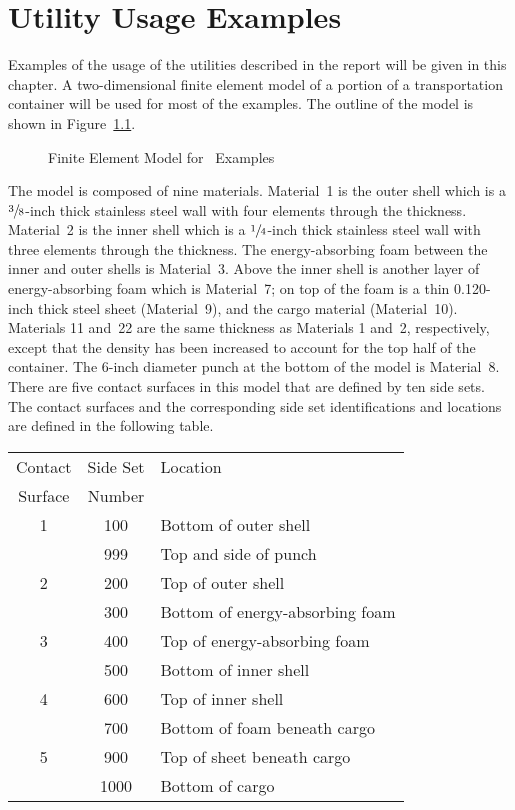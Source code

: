 \chapter{Utility Usage Examples}\label{c:examples}

Examples of the usage of the utilities described in the report will be
given in this chapter.  A two-dimensional finite element model of a
portion of a transportation container will be used for most of the
examples.  The outline of the model is shown in Figure~\ref{exmodel}.
\begin{figure}
\vspace{5.0in}
\caption{Finite Element Model for \numbers\ Examples}\label{exmodel}
\end{figure}
The model is composed of nine materials.  Material~1 is the outer shell
which is a $\sfrac{3}{8}$-inch thick stainless steel wall with four
elements through the thickness.  Material~2 is the inner shell which is
a $\sfrac{1}{4}$-inch thick stainless steel wall with three elements
through the thickness.  The energy-absorbing foam between the inner and
outer shells is Material~3.  Above the inner shell is another layer of
energy-absorbing foam which is Material~7;  on top of the foam is a thin
0.120-inch thick steel sheet (Material~9), and the cargo material
(Material~10).  Materials 11 and~22 are the same thickness as Materials
1 and~2, respectively, except that the density has been increased to
account for the top half of the container.  The 6-inch diameter punch at
the bottom of the model is Material~8.  There are five contact surfaces
in this model that are defined by ten side sets.  The contact surfaces
and the corresponding side set identifications and locations are defined
in the following table.

\begin{center}
\begin{tabular}{|ccl|}\hline
Contact  & Side Set  &  Location \\ 
Surface  & Number    &            \\ \hline \hline
      1  &  100      &  Bottom of outer shell \\
         &  999      &  Top and side of punch      \\ \hline
      2  &  200      &  Top of outer shell    \\
         &  300      &  Bottom of energy-absorbing foam  \\ \hline
      3  &  400      &  Top of energy-absorbing foam  \\
         &  500      &  Bottom of inner shell         \\ \hline
      4  &  600      &  Top of inner shell \\
         &  700      &  Bottom of foam beneath cargo  \\ \hline
      5  &  900      &  Top of sheet beneath cargo \\
         & 1000      &  Bottom of cargo   \\ \hline
\end{tabular}
\end{center}

